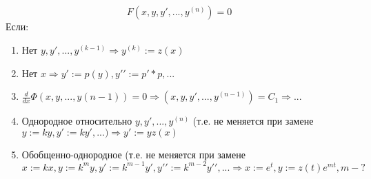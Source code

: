 \documentclass[a5paper,10pt]{article}
\begin{document}
		\subsection{}
			$$ F(x,y,y\prime,...,y^{(n)}) = 0 $$
			Если:
			\begin{enumerate}
				\item Нет $ y,y\prime,...,y^{(k-1)} \Rightarrow y^{(k)} := z(x) $
				
				\item Нет $ x \Rightarrow y\prime:=p(y), y\prime\prime:=p\prime*p, ... $
				
				\item $ \frac{d}{dx}\Phi(x, y, ..., y(n-1))=0 \Rightarrow (x, y, y\prime, ..., y^{(n-1)}) = C_1 \Rightarrow ... $
				
				\item Однородное относительно $ y,y\prime,...,y^{(n)} $ (т.е. не меняется при замене $ y := ky, y\prime:=ky\prime, ...) \Rightarrow y\prime:=yz(x) $
				
				\item Обобщенно-однородное (т.е. не меняется при замене $ x:=kx, y:=k^m y, y\prime:=k^{m-1}y\prime, y\prime\prime:=k^{m-2}y\prime\prime, ...\Rightarrow x:=e^t, y:=z(t)e^{mt}, m - ? $
			\end{enumerate}
\end{document}

